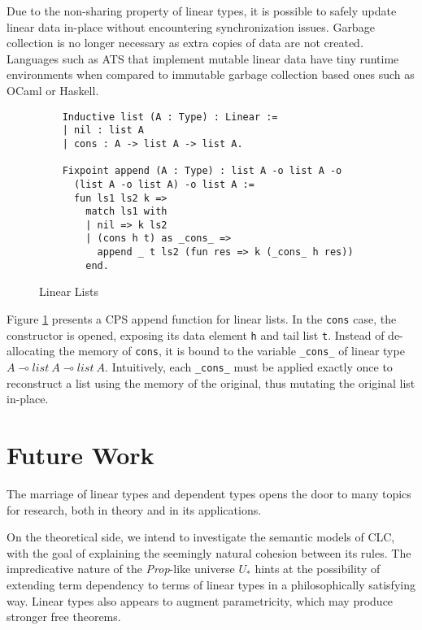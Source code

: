\documentclass[sigplan,screen]{acmart}
\theoremstyle{definition}
\begin{document}
  Due to the non-sharing property of linear types, it is possible to safely update linear data in-place without encountering synchronization issues. Garbage collection is no longer necessary as extra copies of data are not created. Languages such as ATS that implement mutable linear data have tiny runtime environments when compared to immutable garbage collection based ones such as OCaml or Haskell.

  \begin{figure}[h]
    \vspace{-1em}
    \caption{Linear Lists}
    \begin{lstlisting}
    Inductive list (A : Type) : Linear :=
    | nil : list A
    | cons : A -> list A -> list A.
    
    Fixpoint append (A : Type) : list A -o list A -o 
      (list A -o list A) -o list A :=
      fun ls1 ls2 k =>
        match ls1 with
        | nil => k ls2
        | (cons h t) as _cons_ => 
          append _ t ls2 (fun res => k (_cons_ h res))
        end.
    \end{lstlisting}
    \label{list}
    \vspace{-1em}
    \Description{}
  \end{figure}

  Figure \ref{list} presents a CPS append function for linear lists. In the \texttt{cons} case, the constructor is opened, exposing its data element \texttt{h} and tail list \texttt{t}. Instead of de-allocating the memory of \texttt{cons}, it is bound to the variable \texttt{_cons_} of linear type $A \multimap list\ A \multimap list\ A$. Intuitively, each \texttt{_cons_} must be applied exactly once to reconstruct a list using the memory of the original, thus mutating the original list in-place.

  \section{Future Work}
  The marriage of linear types and dependent types opens the door to many topics for research, both in theory and in its applications.

  On the theoretical side, we intend to investigate the semantic models of CLC, with the goal of explaining the seemingly natural cohesion between its rules. The impredicative nature of the \textit{Prop}-like universe $U_*$ hints at the possibility of extending term dependency to terms of linear types in a philosophically satisfying way. Linear types also appears to augment parametricity, which may produce stronger free theorems.
\end{document}
